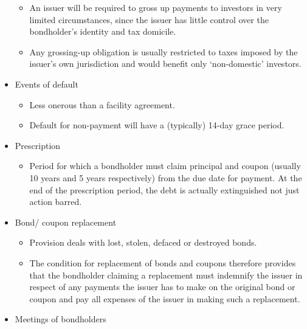 \documentclass[
]{article}
\providecommand{\tightlist}{%
  \setlength{\itemsep}{0pt}\setlength{\parskip}{0pt}}
\begin{document}
\begin{itemize}
  \begin{itemize}
  \tightlist
  \item
    An issuer will be required to gross up payments to investors in very
    limited circumstances, since the issuer has little control over the
    bondholder's identity and tax domicile.
  \item
    Any grossing-up obligation is usually restricted to taxes imposed by
    the issuer's own jurisdiction and would benefit only `non-domestic'
    investors.
  \end{itemize}
\item
  Events of default

  \begin{itemize}
  \tightlist
  \item
    Less onerous than a facility agreement.
  \item
    Default for non-payment will have a (typically) 14-day grace period.
  \end{itemize}
\item
  Prescription

  \begin{itemize}
  \tightlist
  \item
    Period for which a bondholder must claim principal and coupon
    (usually 10 years and 5 years respectively) from the due date for
    payment. At the end of the prescription period, the debt is actually
    extinguished not just action barred.
  \end{itemize}
\item
  Bond/ coupon replacement

  \begin{itemize}
  \tightlist
  \item
    Provision deals with lost, stolen, defaced or destroyed bonds.
  \item
    The condition for replacement of bonds and coupons therefore
    provides that the bondholder claiming a replacement must indemnify
    the issuer in respect of any payments the issuer has to make on the
    original bond or coupon and pay all expenses of the issuer in making
    such a replacement.
  \end{itemize}
\item
  Meetings of bondholders


\end{itemize}
\end{document}
